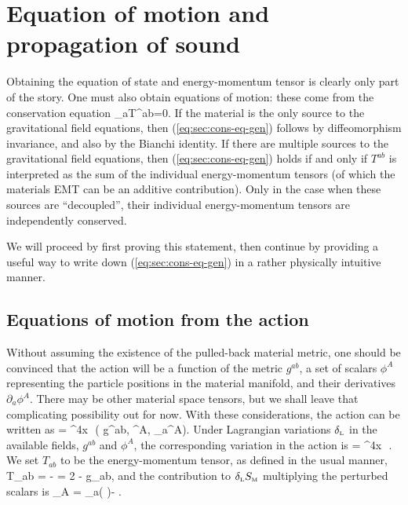 \section{Equation of motion and propagation of sound}
Obtaining the equation of state and energy-momentum tensor is clearly only part of the story. One must also obtain equations of motion: these come from the conservation equation
\bea
\label{eq:sec:cons-eq-gen}
\nabla_aT^{ab}=0.
\eea
If the material is the only source to the gravitational field equations, then (\ref{eq:sec:cons-eq-gen}) follows by diffeomorphism invariance, and also by the Bianchi identity. If there are multiple sources to the gravitational field equations, then (\ref{eq:sec:cons-eq-gen}) holds if and only if $T^{ab}$ is interpreted as the sum of the individual energy-momentum tensors (of which the materials EMT can be an additive contribution). Only in  the case when these sources are ``decoupled'', their individual energy-momentum tensors are independently conserved.

We will proceed by first proving this statement, then continue by providing a useful way to write down  (\ref{eq:sec:cons-eq-gen}) in a rather physically intuitive manner.

\subsection{Equations of motion from the action}
Without assuming the existence of the pulled-back material metric, one should be convinced that the action will be a function of the metric $g^{ab}$,  a set of scalars $\phi^A$ representing the particle positions in the material manifold, and their derivatives $  \partial_a\phi^A$. There may  be other material space tensors, but we shall leave that complicating possibility out for now. With these considerations, the action can be written as
\bea
{} = \int \dd^4x\,\, \rho\left( g^{ab}, \phi^A, \partial_a\phi^A\right).
\eea
Under Lagrangian variations ${ {\delta}_{\scriptscriptstyle{\rm{L}}}}$ in the available fields, $g^{ab}$ and $\phi^A$, the corresponding variation in the action is
\bea
\lp {}  = \int \dd^4x\,\, .
\eea
We set $T_{ab}$ to be the energy-momentum tensor, as defined in the usual manner, 
\bea
T_{ab} = -  = 2 - \rho g_{ab},
\eea
and the contribution to ${ {\delta}_{\scriptscriptstyle{\rm{L}}}} {S}_{\scriptscriptstyle{\textrm{M}}}$ multiplying the perturbed scalars is
\bea
{}_A = \nabla_a\left( \right)-  .
\eea

